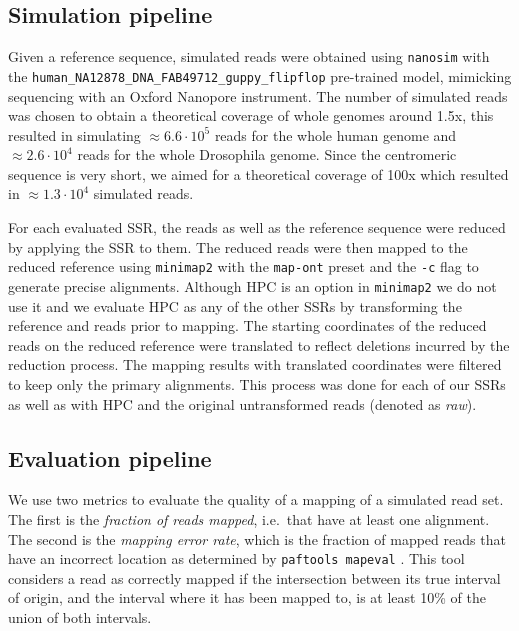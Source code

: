 \documentclass[
  11pt,
  twoside,
  BCOR=10mm,
  listof=totoc]{scrbook}
\begin{document}
\hypertarget{simulation-pipeline}{%
\subsection{Simulation pipeline}\label{simulation-pipeline}}

Given a reference sequence, simulated reads were obtained using \texttt{nanosim} \autocite{yangNanoSimNanoporeSequence2017} with the \texttt{human\_NA12878\_DNA\_FAB49712\_guppy\_flipflop} pre-trained model, mimicking sequencing with an Oxford Nanopore instrument. The number of simulated reads was chosen to obtain a theoretical coverage of whole genomes around 1.5x, this resulted in simulating \(\approx 6.6\cdot10^5\) reads for the whole human genome and \(\approx 2.6\cdot10^4\) reads for the whole Drosophila genome. Since the centromeric sequence is very short, we aimed for a theoretical coverage of 100x which resulted in \(\approx 1.3\cdot10^4\) simulated reads.

For each evaluated SSR, the reads as well as the reference sequence were reduced by applying the SSR to them. The reduced reads were then mapped to the reduced reference using \texttt{minimap2}\autocite{liMinimap2PairwiseAlignment2018} with the \texttt{map-ont} preset and the \texttt{-c} flag to generate precise alignments. Although HPC is an option in \texttt{minimap2} we do not use it and we evaluate HPC as any of the other SSRs by transforming the reference and reads prior to mapping. The starting coordinates of the reduced reads on the reduced reference were translated to reflect deletions incurred by the reduction process. The mapping results with translated coordinates were filtered to keep only the primary alignments. This process was done for each of our SSRs as well as with HPC and the original untransformed reads (denoted as \emph{raw}).

\hypertarget{evaluation-pipeline}{%
\subsection{Evaluation pipeline}\label{evaluation-pipeline}}

We use two metrics to evaluate the quality of a mapping of a simulated read set. The first is the \emph{fraction of reads mapped}, i.e.~that have at least one alignment. The second is the \emph{mapping error rate}, which is the fraction of mapped reads that have an incorrect location as determined by \texttt{paftools\ mapeval} \autocite{liMinimap2PairwiseAlignment2018}. This tool considers a read as correctly mapped if the intersection between its true interval of origin, and the interval where it has been mapped to, is at least 10\% of the union of both intervals.
\end{document}
